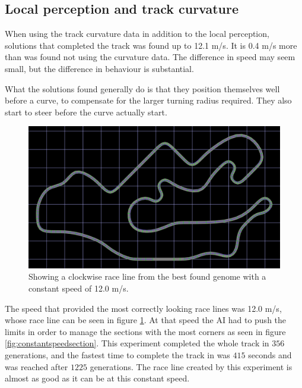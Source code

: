 \subsection{Local perception and track curvature}
\label{subsec:fixedspeedcurvature}

When using the track curvature data in addition to the local perception, solutions that completed the track was found up to 12.1 m/s. It is 0.4 m/s more than was found not using the curvature data. The difference in speed may seem small, but the difference in behaviour is substantial.

What the solutions found generally do is that they position themselves well before a curve, to compensate for the larger turning radius required. They also start to steer before the curve actually start.

\begin{figure}[h]
\includegraphics[width=\textwidth]{report/images/fixed_curve_data}
\centering
\caption{Showing a clockwise race line from the best found genome with a constant speed of 12.0 m/s.}
\label{fig:constantspeedline}
\end{figure}

The speed that provided the most correctly looking race lines was 12.0 m/s, whose race line can be seen in figure \ref{fig:constantspeedline}. At that speed the AI had to push the limits in order to manage the sections with the most corners as seen in figure \ref{fig:constantspeedsection}. This experiment completed the whole track in $356$ generations, and the fastest time to complete the track in was $415$ seconds and was reached after $1225$ generations. The race line created by this experiment is almost as good as it can be at this constant speed. 

